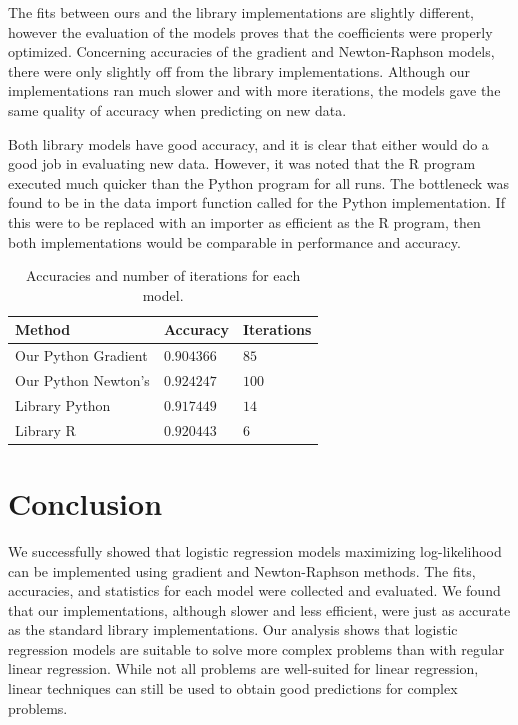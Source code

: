 \documentclass[letterpaper]{article} %
\begin{document}
The fits between ours and the library implementations are slightly different,
however the evaluation of the models proves that the coefficients were properly
optimized. Concerning accuracies of the gradient and Newton-Raphson models,
there were only slightly off from the library implementations.
Although our implementations ran much slower and with more iterations,
the models gave the same quality of accuracy when predicting on new data.

Both library models have good accuracy, and it is clear that either would do a good job in
evaluating new data. However, it was noted that the R program executed much quicker than the Python program
for all runs.
The bottleneck was found to be in the data import function called for the Python
implementation. If this were to be replaced with an importer as efficient as
the R program, then both implementations would be comparable in performance
and accuracy.

\begin{table}[t]
\begin{centering}
\bgroup
\def\arraystretch{1.5}
\begin{tabular}{| m{} | m{} | m{} |} 
\hline
Method & Accuracy & Iterations \\ 
\hline
\hline
Our Python Gradient & $0.904366$ & $85$ \\
\hline
Our Python Newton's & $0.924247$ & $100$ \\
\hline
\hline
Library Python & $0.917449$ & $14$ \\
\hline
Library R & $0.920443$ & $6$ \\
\hline
\end{tabular}
\caption{Accuracies and number of iterations for each model.}
\label{tbl:accuracy}
\egroup
\end{centering}
\end{table}

\section{Conclusion}
We successfully showed that logistic regression models
maximizing log-likelihood
can be implemented
using gradient and Newton-Raphson methods.
The fits, accuracies, and statistics for each model were collected and evaluated.
We found that our implementations, although slower and less efficient,
were just as accurate as the standard library implementations.
Our analysis shows that logistic regression models are
suitable to solve more complex problems than with regular linear regression.
While not all problems are well-suited for linear regression, linear techniques
can still be used to obtain good predictions for complex problems.
\end{document}
